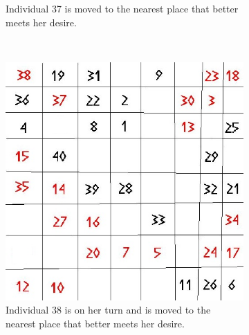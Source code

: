 \begin{figure}[H]
\begin{subfigure}{0.3\textwidth}
        \caption{Individual 37 is moved to the nearest place that better meets her desire. }
        \label{fig:movement2}
    \end{subfigure}
    ~ %
    \begin{subfigure}{0.3\textwidth}
        \includegraphics[width=\textwidth]{Tegenvoorbeeld/segregation_tegenvb_2.jpg}
        \caption{Individual 38 is on her turn and is moved to the nearest place that better meets her desire.}
        \label{fig:movement3}
    \end{subfigure}\hspace{1cm}
    \begin{subfigure}{0.3\textwidth}

\end{subfigure}
\end{figure}
